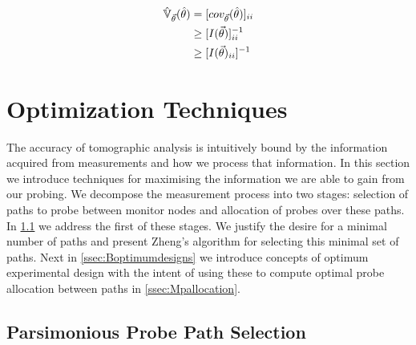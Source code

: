 \begin{align*}
    \operatorname{\hat{\mathbb{V}}}_{\vec{\theta}}(\hat\theta) &= [cov_{\vec{\theta}}(\hat\theta)]_{ii}\\
    &\geq [I(\vec{\theta})]^{-1}_{ii}\\
    &\geq [I(\vec{\theta})_{ii}]^{-1}
\end{align*}

\section{Optimization Techniques}
\label{sec:Boptimization}
The accuracy of tomographic analysis is intuitively bound by the information acquired from measurements and how we process that information. In this section we introduce techniques for maximising the information we are able to gain from our probing. We decompose the measurement process into two stages: selection of paths to probe between monitor nodes and allocation of probes over these paths. In \cref{ssec:Bparsppselection} we address the first of these stages. We justify the desire for a minimal number of paths and present Zheng's algorithm for selecting this minimal set of paths. Next in \cref{ssec:Boptimumdesigns} we introduce concepts of optimum experimental design with the intent of using these to compute optimal probe allocation between paths in \cref{ssec:Mpallocation}.

\subsection{Parsimonious Probe Path Selection}
\label{ssec:Bparsppselection}

